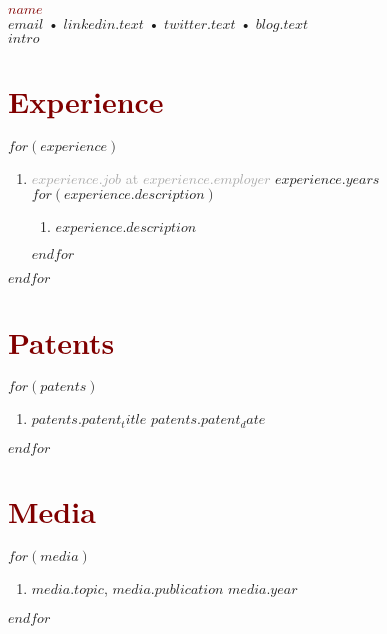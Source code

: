 \documentclass[$fontsize$, a4paper]{article}
\begin{document}
\textcolor{Maroon}{\LARGE \textbf{$name$}}\\[.3cm]
\textcolor{darkgray}{} \href{mailto:$email$}{$email$} • \textcolor{darkgray}{} \href{$linkedin.url$}{$linkedin.text$} • \textcolor{darkgray}{} \href{$twitter.url$}{$twitter.text$} • \textcolor{darkgray}{} \href{$blog.url$}{$blog.text$}\\[.3cm]
$intro$

\section*{\textcolor{Maroon}{Experience}}
$for(experience)$
  \begin{enumerate}
    [topsep=10pt,itemsep=0pt,parsep=0pt,partopsep=0pt,leftmargin=10pt,label=•]
    \item{\textcolor{darkgray}{\textbf{$experience.job$} at \textbf{$experience.employer$}} \hfill $experience.years$}
    $for(experience.description)$
    \begin{enumerate}
      [topsep=0pt,itemsep=0pt,parsep=0pt,partopsep=0pt,leftmargin=10pt,label=•]
      \item{$experience.description$}
    \end{enumerate}
    $endfor$
  \end{enumerate}
$endfor$

\section*{\textcolor{Maroon}{Patents}}
$for(patents)$
  \begin{enumerate}
    [topsep=0pt,itemsep=0pt,parsep=0pt,partopsep=0pt,leftmargin=10pt,label=•]
    \item{\href{$patents.patent_url$}{$patents.patent_title$} \hfill $patents.patent_date$}
  \end{enumerate}
$endfor$

\section*{\textcolor{Maroon}{Media}}
$for(media)$
  \begin{enumerate}
    [topsep=0pt,itemsep=0pt,parsep=0pt,partopsep=0pt,leftmargin=10pt,label=•]
    \item{$media.topic$, \href{$media.url$}{$media.publication$} \hfill $media.year$}
  \end{enumerate}
$endfor$
\end{document}
